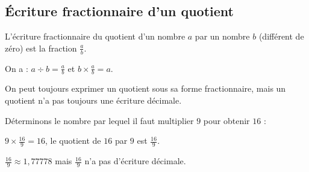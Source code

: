 \begin{pageCours}
\section{Écriture fractionnaire d'un quotient}

\begin{Def}
L'écriture fractionnaire du quotient d'un nombre $a$ par un nombre $b$ (différent de zéro) est la fraction $\frac{a}{b}$.

On a : $a\div b=\frac{a}{b}$ et $b\times\frac{a}{b}=a$.
\end{Def}

\begin{Rq}
On peut toujours exprimer un quotient sous sa forme fractionnaire, mais un quotient n'a pas toujours une écriture décimale.
\end{Rq}

\begin{Ex}
Déterminons le nombre par lequel il faut multiplier $9$ pour obtenir $16$ :

$9\times\frac{16}{9}=16$, le quotient de $16$ par $9$ est $\frac{16}{9}$.

$\frac{16}{9}\approx1,77778$ mais $\frac{16}{9}$ n'a pas d'écriture décimale.
\end{Ex}



% 

\end{pageCours} 
